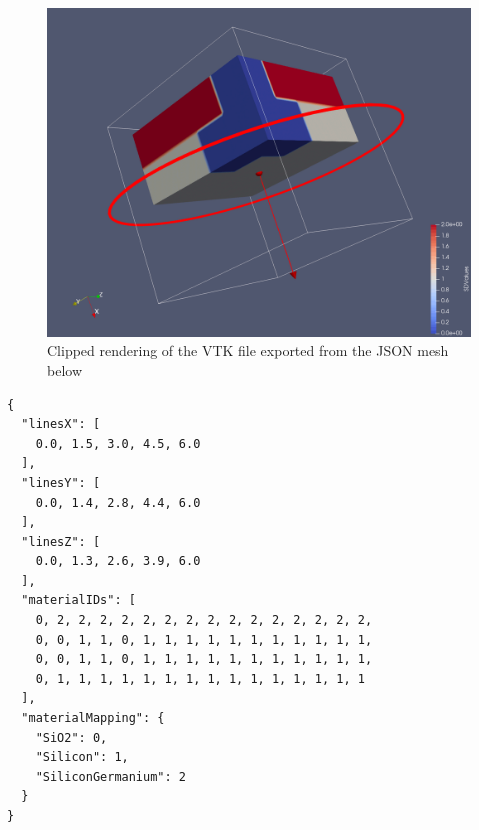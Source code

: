 \begin{figure}[!htb]
  \centering
  \includegraphics[width=1.0\textwidth]{images/vtk-export-cut.png}
  \caption{\label{fig-vtk-export-cut} Clipped rendering of the VTK file exported from the JSON mesh below}
\end{figure}

\begin{lstlisting}
{
  "linesX": [
    0.0, 1.5, 3.0, 4.5, 6.0
  ],
  "linesY": [
    0.0, 1.4, 2.8, 4.4, 6.0
  ],
  "linesZ": [
    0.0, 1.3, 2.6, 3.9, 6.0
  ],
  "materialIDs": [
    0, 2, 2, 2, 2, 2, 2, 2, 2, 2, 2, 2, 2, 2, 2, 2,
    0, 0, 1, 1, 0, 1, 1, 1, 1, 1, 1, 1, 1, 1, 1, 1,
    0, 0, 1, 1, 0, 1, 1, 1, 1, 1, 1, 1, 1, 1, 1, 1,
    0, 1, 1, 1, 1, 1, 1, 1, 1, 1, 1, 1, 1, 1, 1, 1
  ],
  "materialMapping": {
    "SiO2": 0,
    "Silicon": 1,
    "SiliconGermanium": 2
  }
}
\end{lstlisting}
